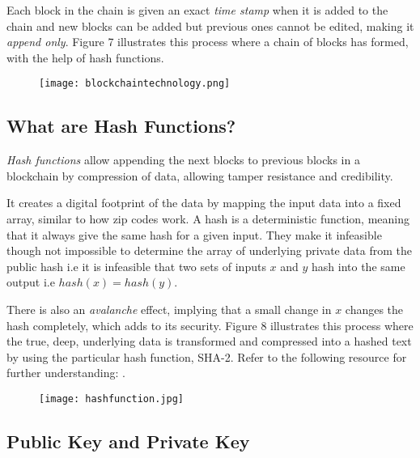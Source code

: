 \documentclass[12pt]{article}
\newcommand{\1}{\mathbbm 1}
\begin{document}
		Each block in the chain is given an exact \textit{time stamp} when it is added to the chain and new blocks can be added but previous ones cannot be edited, making it \textit{append only}. Figure 7 illustrates this process where a chain of blocks has formed, with the help of hash functions.
		
		\begin{figure}[H]
			\begin{Center}
				\texttt{[image: blockchaintechnology.png]}		
				\caption{}
			\end{Center}
		\end{figure}
		
		\subsection{\textbf{What are Hash Functions?}}
		
		\textit{Hash functions} allow appending the next blocks to previous blocks in a blockchain by compression of data, allowing tamper resistance and credibility. 
		
		It creates a digital footprint of the data by mapping the input data into a fixed array, similar to how zip codes work. A hash is a deterministic function, meaning that it always give the same hash for a given input. They make it infeasible though not impossible to determine the array of underlying private data from the public hash i.e it is infeasible that two sets of inputs $x$ and $y$ hash into the same output i.e $hash(x) = hash(y)$.
		
		There is also an \textit{avalanche} effect, implying that a small change in $x$ changes the hash completely, which adds to its security. Figure 8 illustrates this process where the true, deep, underlying data is transformed and compressed into a hashed text by using the particular hash function, SHA-2. Refer to the following resource for further understanding:
		{\color{blue}{https://www.youtube.com/watch?v=160oMzblY8}}.
		
		
		
		\begin{figure}[H]
			\begin{Center}
				\texttt{[image: hashfunction.jpg]}		
				\caption{}
			\end{Center}
		\end{figure}
		
		
		\subsection{\textbf{Public Key and Private Key}}
		
\end{document}
